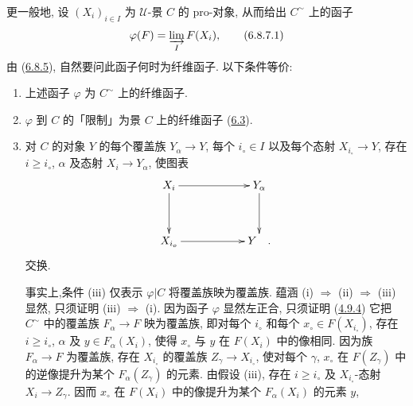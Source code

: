 \subsubsection{}
更一般地, 设 $(X_i)_{i\in I}$ 为 $𝒰$-景 $C$ 的 pro-对象, 从而给出 $C^{\sim}$ 上的函子
\begin{equation*}
\varphi(F)=\varinjlim_I F(X_i){},\tag{6.8.7.1}
\end{equation*}
由 (\hyperref[IV.subsubsec6.8.5]{6.8.5}), 自然要问此函子何时为纤维函子. 以下条件等价:
\begin{enumerate}
\renewcommand{\theenumi}{\roman{enumi}}
\renewcommand{\labelenumi}{(\theenumi)}
\item 上述函子 $\varphi$ 为 $C^{\sim}$ 上的纤维函子.

\item $\varphi$ 到 $C$ 的「限制」为景 $C$ 上的纤维函子 (\hyperref[IV.subsec6.3]{6.3}).

\item 对 $C$ 的对象 $Y$ 的每个覆盖族 $Y_{\alpha}\rightarrow Y$, 每个 $i_{\circ}\in I$ 以及每个态射 $X_{i_{\circ}}\rightarrow Y$, 存在 $i\geq i_{\circ}$, $\alpha$ 及态射 $X_i\rightarrow Y_{\alpha}$, 使图表
\[
\xymatrix@C=2cm@R=1.25cm{
X_i \ar[d] \ar[r]& Y_{\alpha} \ar[d]\\
X_{{i}_{o}} \ar[r]     &  Y \quad . }
\]
交换.

事实上,\pageoriginale 条件 (iii) 仅表示 $\varphi| C$ 将覆盖族映为覆盖族. 蕴涵 (i) $\Rightarrow$ (ii) $\Rightarrow$ (iii) 显然, 只须证明 (iii) $\Rightarrow$ (i). 因为函子 $\varphi$ 显然左正合, 只须证明 (\hyperref[IV.prop4.9.4]{4.9.4}) 它把 $C^{\sim}$ 中的覆盖族 $F_{\alpha}\rightarrow F$ 映为覆盖族, 即对每个 $i_{\circ}$ 和每个 $x_{\circ}\in F(X_{i_{\circ}})$, 存在 $i\geq i_{\circ}$, $\alpha$ 及 $y\in F_{\alpha}(X_i)$, 使得 $x_{\circ}$ 与 $y$ 在 $F(X_i)$ 中的像相同. 因为族 $F_{\alpha}\rightarrow F$ 为覆盖族, 存在 $X_{i_{\circ}}$ 的覆盖族 $Z_{\gamma}\rightarrow X_{i_{\circ}}$, 使对每个 $\gamma$, $x_{\circ}$ 在 $F(Z_{\gamma})$ 中的逆像提升为某个 $F_{\alpha}(Z_{\gamma})$ 的元素. 由假设 (iii), 存在 $i\geq i_{\circ}$ 及 $X_{i_{\circ}}$-态射 $X_i\rightarrow Z_{\gamma}$. 因而 $x_{\circ}$ 在 $F(X_i)$ 中的像提升为某个 $F_{\alpha}(X_i)$ 的元素 $y$, \cqfd
\end{enumerate}

